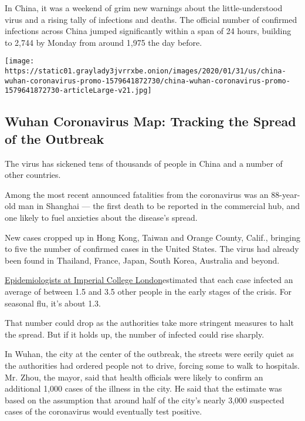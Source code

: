 In China, it was a weekend of grim new warnings about the
little-understood virus and a rising tally of infections and deaths. The
official number of confirmed infections across China jumped
significantly within a span of 24 hours, building to 2,744 by Monday
from around 1,975 the day before.

\href{https://www.nytimes3xbfgragh.onion/interactive/2020/01/21/world/asia/china-coronavirus-maps.html}{}

\texttt{[image: https://static01.graylady3jvrrxbe.onion/images/2020/01/31/us/china-wuhan-coronavirus-promo-1579641872730/china-wuhan-coronavirus-promo-1579641872730-articleLarge-v21.jpg]}

\hypertarget{wuhan-coronavirus-map-tracking-the-spread-of-the-outbreak}{%
\subsection{Wuhan Coronavirus Map: Tracking the Spread of the
Outbreak}\label{wuhan-coronavirus-map-tracking-the-spread-of-the-outbreak}}

The virus has sickened tens of thousands of people in China and a number
of other countries.

Among the most recent announced fatalities from the coronavirus was an
88-year-old man in Shanghai --- the first death to be reported in the
commercial hub, and one likely to fuel anxieties about the disease's
spread.

New cases cropped up in Hong Kong, Taiwan and Orange County, Calif.,
bringing to five the number of confirmed cases in the United States. The
virus had already been found in Thailand, France, Japan, South Korea,
Australia and beyond.

\href{https://www.imperial.ac.uk/mrc-global-infectious-disease-analysis/news--wuhan-coronavirus/}{Epidemiologists
at Imperial College London}estimated that each case infected an average
of between 1.5 and 3.5 other people in the early stages of the crisis.
For seasonal flu, it's about 1.3.

That number could drop as the authorities take more stringent measures
to halt the spread. But if it holds up, the number of infected could
rise sharply.

In Wuhan, the city at the center of the outbreak, the streets were
eerily quiet as the authorities had ordered people not to drive, forcing
some to walk to hospitals. Mr. Zhou, the mayor, said that health
officials were likely to confirm an additional 1,000 cases of the
illness in the city. He said that the estimate was based on the
assumption that around half of the city's nearly 3,000 suspected cases
of the coronavirus would eventually test positive.

